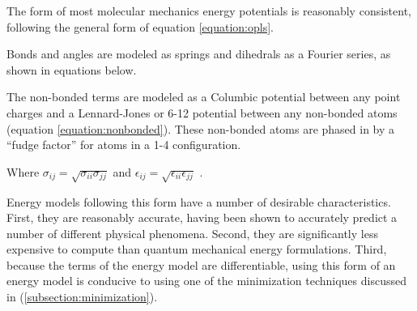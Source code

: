 The form of most molecular mechanics energy potentials is reasonably consistent, following the general form of equation \ref{equation:opls}.

Bonds and angles are modeled as springs and dihedrals as a Fourier series, as shown in equations below.



The non-bonded terms are modeled as a Columbic potential between any point charges and a Lennard-Jones or 6-12 potential between any non-bonded atoms (equation \ref{equation:nonbonded}).
These non-bonded atoms are phased in by a ``fudge factor'' for atoms in a 1-4 configuration.

Where $\sigma_{ij} = \sqrt{\sigma_{ii} \sigma_{jj}}$ and $\epsilon_{ij} = \sqrt{\epsilon_{ii}\epsilon_{jj}}$ \cite{jorgensen1996development}.

Energy models following this form have a number of desirable characteristics.
First, they are reasonably accurate, having been shown to accurately predict a number of different physical phenomena.
Second, they are significantly less expensive to compute than quantum mechanical energy formulations.
Third, because the terms of the energy model are differentiable, using this form of an energy model is conducive to using one of the minimization techniques discussed in  (\ref{subsection:minimization}).
